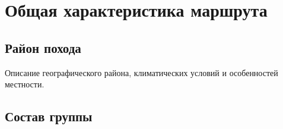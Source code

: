 \chapter{Общая характеристика маршрута}

\section{Район похода}

Описание географического района,
климатических условий и особенностей местности.

\section{Состав группы}

